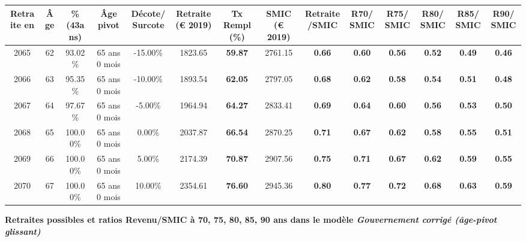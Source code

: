 \begin{adjustbox}{max width=\textwidth} 
\begin{tabular}[htb]{|c|c||c|c|c||c|c||c|c||c|c|c|c|c|} 
\hline 
 Retraite en &  Âge &  \%(43ans) &  Âge pivot &  Décote/Surcote &  Retraite (\euro{} 2019) &  Tx Rempl(\%) &  SMIC (\euro{} 2019) &  Retraite/SMIC &  R70/SMIC &  R75/SMIC &  R80/SMIC &  R85/SMIC &  R90/SMIC \\ 
\hline \hline 
 2065 &  62 &  93.02\% &  65 ans 0 mois &  -15.00\% &  1823.65 &  {\bf 59.87} &  2761.15 &  {\bf {\color{red} 0.66}} &  {\bf {\color{red} 0.60}} &  {\bf {\color{red} 0.56}} &  {\bf {\color{red} 0.52}} &  {\bf {\color{red} 0.49}} &  {\bf {\color{red} 0.46}} \\ 
\hline 
 2066 &  63 &  95.35\% &  65 ans 0 mois &  -10.00\% &  1893.54 &  {\bf 62.05} &  2797.05 &  {\bf {\color{red} 0.68}} &  {\bf {\color{red} 0.62}} &  {\bf {\color{red} 0.58}} &  {\bf {\color{red} 0.54}} &  {\bf {\color{red} 0.51}} &  {\bf {\color{red} 0.48}} \\ 
\hline 
 2067 &  64 &  97.67\% &  65 ans 0 mois &  -5.00\% &  1964.94 &  {\bf 64.27} &  2833.41 &  {\bf {\color{red} 0.69}} &  {\bf {\color{red} 0.64}} &  {\bf {\color{red} 0.60}} &  {\bf {\color{red} 0.56}} &  {\bf {\color{red} 0.53}} &  {\bf {\color{red} 0.50}} \\ 
\hline 
 2068 &  65 &  100.00\% &  65 ans 0 mois &  0.00\% &  2037.87 &  {\bf 66.54} &  2870.25 &  {\bf {\color{red} 0.71}} &  {\bf {\color{red} 0.67}} &  {\bf {\color{red} 0.62}} &  {\bf {\color{red} 0.58}} &  {\bf {\color{red} 0.55}} &  {\bf {\color{red} 0.51}} \\ 
\hline 
 2069 &  66 &  100.00\% &  65 ans 0 mois &  5.00\% &  2174.39 &  {\bf 70.87} &  2907.56 &  {\bf {\color{red} 0.75}} &  {\bf {\color{red} 0.71}} &  {\bf {\color{red} 0.67}} &  {\bf {\color{red} 0.62}} &  {\bf {\color{red} 0.59}} &  {\bf {\color{red} 0.55}} \\ 
\hline 
 2070 &  67 &  100.00\% &  65 ans 0 mois &  10.00\% &  2354.61 &  {\bf 76.60} &  2945.36 &  {\bf {\color{red} 0.80}} &  {\bf {\color{red} 0.77}} &  {\bf {\color{red} 0.72}} &  {\bf {\color{red} 0.68}} &  {\bf {\color{red} 0.63}} &  {\bf {\color{red} 0.59}} \\ 
\hline 
\hline 
\end{tabular} 
\end{adjustbox} 
 
 \vspace{0.1cm} 
{\bf \noindent Retraites possibles et ratios Revenu/SMIC à 70, 75, 80, 85, 90 ans dans le modèle \emph{Gouvernement corrigé (âge-pivot glissant)}}  
 
